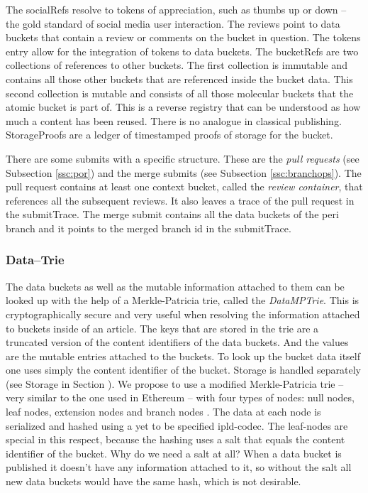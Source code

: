 \documentclass[14pt]{article}
\begin{document}
The socialRefs resolve to tokens of appreciation, such as thumbs up or down -- the gold standard of social media user interaction. The reviews point to data buckets that contain a review or comments on the bucket in question. The tokens entry allow for the integration of tokens to data buckets. The bucketRefs are two collections of references to other buckets. The first collection is immutable and contains all those other buckets that are referenced inside the bucket data. This second collection is mutable and consists of all those molecular buckets that the atomic bucket is part of. This is a reverse registry that can be understood as how much a content has been reused. There is no analogue in classical publishing. StorageProofs are a ledger of timestamped proofs of storage for the bucket.  

There are some submits with a specific structure. These are the \textit{pull requests} (see Subsection \ref{ssc:por}) and the merge submits (see Subsection \ref{ssc:branchops}). The pull request  contains at least one context bucket, called the \textit{review container}, that references all the subsequent reviews. It also leaves a trace of the pull request in the submitTrace. The merge submit contains 
all the data buckets of the peri branch and it points to the merged branch id in the submitTrace. 


\subsubsection{Data--Trie}
\label{ssc:datatrie}

The data buckets as well as the mutable information attached to them can be looked up with the help of a Merkle-Patricia trie, called the \textit{DataMPTrie}. This is cryptographically secure and very useful when resolving the information attached to buckets inside of an article. The keys that are stored in the trie are a truncated version of the content identifiers of the data buckets. And the values are the mutable entries attached to the buckets. To look up the bucket data itself one uses simply the content identifier of the bucket. Storage is handled separately (see Storage in Section \label{ssc:storage}).
We propose to use a modified Merkle-Patricia trie -- very similar to the one used in Ethereum -- with four types of nodes: null nodes, leaf nodes, extension nodes and branch nodes \cite{}.
The data at each node is serialized and hashed using a yet to be specified ipld-codec. The leaf-nodes are special in this respect, because the hashing uses a salt that equals the content identifier of the bucket. Why do we need a salt at all? When a data bucket is published it doesn't have any information attached to it, so without the salt all new data buckets would have the same hash, which is not desirable.
\end{document}
